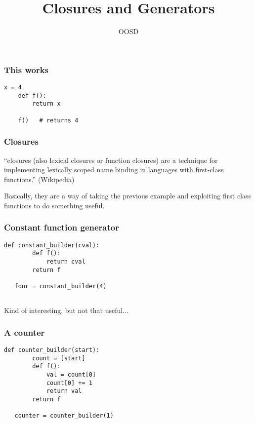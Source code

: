 \documentclass[10pt]{beamer}
\title{Closures and Generators}
\author[IN710]{OOSD}
\institute[Otago Polytechnic]{
  School of Information Technology \\
  Otago Polytechnic \\
  Dunedin, New Zealand \\
}
\date{}
\begin{document}
\begin{frame}[plain]
  \titlepage
\end{frame}

\begin{frame}[fragile]
  \frametitle{This works}

 
\begin{Verbatim}[commandchars=\\\[\]]
    x = 4
    def f():
        return x

    f()   # returns 4
\end{Verbatim}

\end{frame}
\begin{frame}
  \frametitle{Closures}

  ``closures (also lexical closures or function closures) are a 
  technique for implementing lexically scoped name binding in 
  languages with first-class functions.'' (Wikipedia)

  Basically, they are a way of taking the previous example
  and exploiting first class functions to do something useful.

\end{frame}
\begin{frame}[fragile]
  \frametitle{Constant function generator}

 
\begin{Verbatim}[commandchars=\\\[\]]
    def constant_builder(cval):
        def f():
            return cval
        return f

   four = constant_builder(4) 
       
\end{Verbatim}

Kind of interesting, but not that useful...
\end{frame}
\begin{frame}[fragile]
  \frametitle{A counter}

  
\begin{Verbatim}[commandchars=\\\%\%]
    def counter_builder(start):
        count = [start]
        def f():
            val = count[0]
            count[0] += 1
            return val
        return f

   counter = counter_builder(1)
       
\end{Verbatim}

\end{frame}
\end{document}
